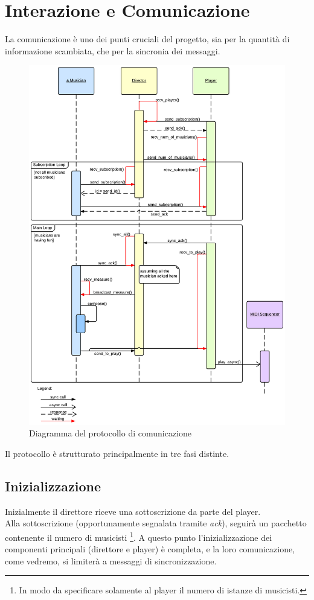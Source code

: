 \section{Interazione e Comunicazione}
La comunicazione è uno dei punti cruciali del progetto,
sia per la quantità di informazione scambiata,
che per la sincronia dei messaggi.

\begin{figure}[H]
\centering
\includegraphics[scale=0.6]{img/protocol.png}
\caption{Diagramma del protocollo di comunicazione}
\end{figure}

Il protocollo è strutturato principalmente in tre fasi distinte.

\subsection{Inizializzazione}
Inizialmente il direttore riceve una sottoscrizione da parte del player.\\
Alla sottoscrizione (opportunamente segnalata tramite \emph{ack}), seguirà un
pacchetto contenente il numero di musicisti
\footnote{In modo da specificare solamente al player
	  il numero di istanze di musicisti.}.
A questo punto l'inizializzazione dei componenti principali
(direttore e player) è completa, e la loro comunicazione, come vedremo,
si limiterà a messaggi di sincronizzazione.


